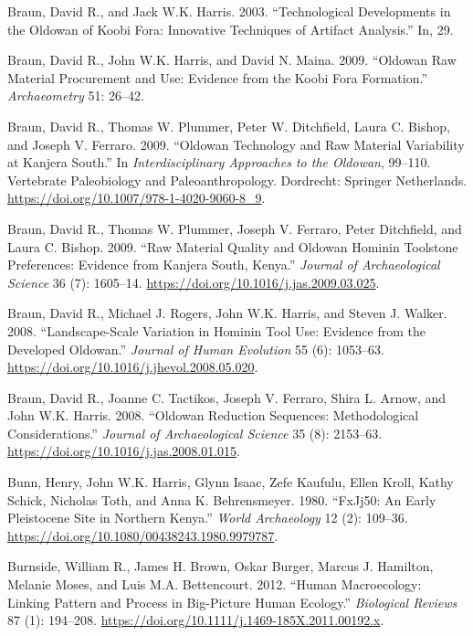 \documentclass[]{elsarticle} %
\begin{document}
\leavevmode\hypertarget{ref-braunTechnologicalDevelopmentsOldowan2003}{}%
Braun, David R., and Jack W.K. Harris. 2003. ``Technological
Developments in the Oldowan of Koobi Fora: Innovative Techniques of
Artifact Analysis.'' In, 29.

\leavevmode\hypertarget{ref-braunOldowanRawMaterial2009}{}%
Braun, David R., John W.K. Harris, and David N. Maina. 2009. ``Oldowan
Raw Material Procurement and Use: Evidence from the Koobi Fora
Formation.'' \emph{Archaeometry} 51: 26--42.

\leavevmode\hypertarget{ref-braunOldowanTechnologyRaw2009}{}%
Braun, David R., Thomas W. Plummer, Peter W. Ditchfield, Laura C.
Bishop, and Joseph V. Ferraro. 2009. ``Oldowan Technology and Raw
Material Variability at Kanjera South.'' In \emph{Interdisciplinary
Approaches to the Oldowan}, 99--110. Vertebrate Paleobiology and
Paleoanthropology. Dordrecht: Springer Netherlands.
\url{https://doi.org/10.1007/978-1-4020-9060-8_9}.

\leavevmode\hypertarget{ref-braunRawMaterialQuality2009}{}%
Braun, David R., Thomas W. Plummer, Joseph V. Ferraro, Peter Ditchfield,
and Laura C. Bishop. 2009. ``Raw Material Quality and Oldowan Hominin
Toolstone Preferences: Evidence from Kanjera South, Kenya.''
\emph{Journal of Archaeological Science} 36 (7): 1605--14.
\url{https://doi.org/10.1016/j.jas.2009.03.025}.

\leavevmode\hypertarget{ref-braunLandscapescaleVariationHominin2008}{}%
Braun, David R., Michael J. Rogers, John W.K. Harris, and Steven J.
Walker. 2008. ``Landscape-Scale Variation in Hominin Tool Use: Evidence
from the Developed Oldowan.'' \emph{Journal of Human Evolution} 55 (6):
1053--63. \url{https://doi.org/10.1016/j.jhevol.2008.05.020}.

\leavevmode\hypertarget{ref-braunOldowanReductionSequences2008}{}%
Braun, David R., Joanne C. Tactikos, Joseph V. Ferraro, Shira L. Arnow,
and John W.K. Harris. 2008. ``Oldowan Reduction Sequences:
Methodological Considerations.'' \emph{Journal of Archaeological
Science} 35 (8): 2153--63.
\url{https://doi.org/10.1016/j.jas.2008.01.015}.

\leavevmode\hypertarget{ref-bunnFxJj50EarlyPleistocene1980}{}%
Bunn, Henry, John W.K. Harris, Glynn Isaac, Zefe Kaufulu, Ellen Kroll,
Kathy Schick, Nicholas Toth, and Anna K. Behrensmeyer. 1980. ``FxJj50:
An Early Pleistocene Site in Northern Kenya.'' \emph{World Archaeology}
12 (2): 109--36. \url{https://doi.org/10.1080/00438243.1980.9979787}.

\leavevmode\hypertarget{ref-burnsideHumanMacroecologyLinking2012}{}%
Burnside, William R., James H. Brown, Oskar Burger, Marcus J. Hamilton,
Melanie Moses, and Luis M.A. Bettencourt. 2012. ``Human Macroecology:
Linking Pattern and Process in Big-Picture Human Ecology.''
\emph{Biological Reviews} 87 (1): 194--208.
\url{https://doi.org/10.1111/j.1469-185X.2011.00192.x}.
\end{document}
